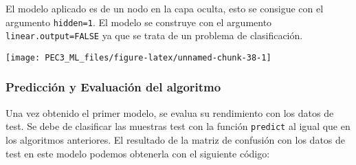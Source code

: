 \documentclass[
]{article}
\newenvironment{Shaded}{\begin{snugshade}}{\end{snugshade}}
\newcommand{\CommentTok}[1]{\textcolor[rgb]{0.56,0.35,0.01}{\textit{#1}}}
\newcommand{\DataTypeTok}[1]{\textcolor[rgb]{0.13,0.29,0.53}{#1}}
\newcommand{\DecValTok}[1]{\textcolor[rgb]{0.00,0.00,0.81}{#1}}
\newcommand{\FloatTok}[1]{\textcolor[rgb]{0.00,0.00,0.81}{#1}}
\newcommand{\KeywordTok}[1]{\textcolor[rgb]{0.13,0.29,0.53}{\textbf{#1}}}
\newcommand{\NormalTok}[1]{#1}
\newcommand{\OperatorTok}[1]{\textcolor[rgb]{0.81,0.36,0.00}{\textbf{#1}}}
\newcommand{\OtherTok}[1]{\textcolor[rgb]{0.56,0.35,0.01}{#1}}
\newcommand{\StringTok}[1]{\textcolor[rgb]{0.31,0.60,0.02}{#1}}
\begin{document}
El modelo aplicado es de un nodo en la capa oculta, esto se consigue con
el argumento \texttt{hidden=1}. El modelo se construye con el argumento
\texttt{linear.output=FALSE} ya que se trata de un problema de
clasificación.

\begin{Shaded}
\end{Shaded}

\begin{center}\texttt{[image: PEC3\_ML\_files/figure-latex/unnamed-chunk-38-1]} \end{center}

\hypertarget{predicciuxf3n-y-evaluaciuxf3n-del-algoritmo-2}{%
\subsubsection{Predicción y Evaluación del
algoritmo}\label{predicciuxf3n-y-evaluaciuxf3n-del-algoritmo-2}}

Una vez obtenido el primer modelo, se evalua su rendimiento con los
datos de test. Se debe de clasificar las muestras test con la función
\texttt{predict} al igual que en los algoritmos anteriores. El resultado
de la matriz de confusión con los datos de test en este modelo podemos
obtenerla con el siguiente código:
\end{document}
